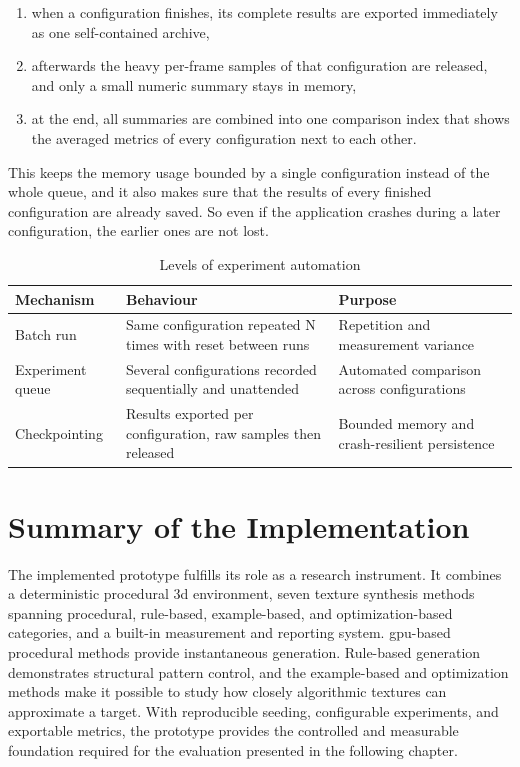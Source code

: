 \begin{enumerate}[noitemsep, topsep=0pt]
    \item when a configuration finishes, its complete results are exported immediately as one self-contained archive,
    \item afterwards the heavy per-frame samples of that configuration are released, and only a small numeric summary stays in memory,
    \item at the end, all summaries are combined into one comparison index that shows the averaged metrics of every configuration next to each other.
\end{enumerate}

This keeps the memory usage bounded by a single configuration instead of the whole queue, and it also makes sure that the results of every finished configuration are already saved. So even if the application crashes during a later configuration, the earlier ones are not lost.

\begin{table}[H]
    \centering
    \caption{Levels of experiment automation}
    \label{tab:automation-levels}
    \begin{tabularx}{\textwidth}{|l|X|X|}
    \hline
    \textbf{Mechanism} & \textbf{Behaviour} & \textbf{Purpose} \\
    \hline
    \hline
    
    Batch run & Same configuration repeated N times with reset between runs & Repetition and measurement variance \\
    \hline

    Experiment queue & Several configurations recorded sequentially and unattended & Automated comparison across configurations \\
    \hline

    Checkpointing & Results exported per configuration, raw samples then released & Bounded memory and crash-resilient persistence \\
    \hline
    
    \end{tabularx}
\end{table}

\section{Summary of the Implementation}

The implemented prototype fulfills its role as a research instrument. It combines a deterministic procedural \gls{3d} environment, seven texture synthesis methods spanning procedural, rule-based, example-based, and optimization-based categories, and a built-in measurement and reporting system. \gls{gpu}-based procedural methods provide instantaneous generation. Rule-based generation demonstrates structural pattern control, and the example-based and optimization methods make it possible to study how closely algorithmic textures can approximate a target. With reproducible seeding, configurable experiments, and exportable metrics, the prototype provides the controlled and measurable foundation required for the evaluation presented in the following chapter.